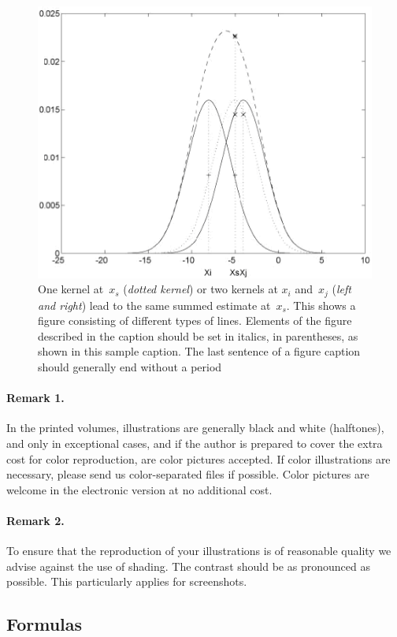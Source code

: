 \documentclass[runningheads]{comsis2}
\begin{document}
\begin{figure}
\centering
\includegraphics[width=.7\textwidth]{figure}
\caption{One kernel at~$x_s$ (\emph{dotted kernel}) or two kernels at $x_i$ and~$x_j$
(\emph{left and right}) lead to the same summed estimate at~$x_s$. This shows
a figure consisting of different types of lines. Elements of the figure described
in the caption should be set in italics, in parentheses, as shown in this sample
caption. The last sentence of a figure caption should generally end without a period}\label{fig:afigure}
\end{figure}

\paragraph{Remark 1.} In the printed volumes, illustrations are generally black and
white (halftones), and only in exceptional cases, and if the author is
prepared to cover the extra cost for color reproduction, are color pictures
accepted. If color illustrations are necessary, please send us color-separated
files if possible. Color pictures are welcome in the electronic version at no
additional cost.

\paragraph{Remark 2.} To ensure that the reproduction of your illustrations is of
reasonable quality we advise against the use of shading. The contrast should
be as pronounced as possible. This particularly applies for screenshots.

\subsection{Formulas}
\end{document}
